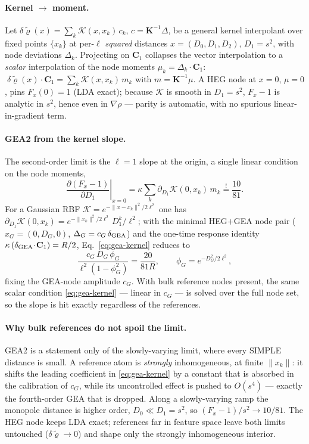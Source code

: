 \paragraph*{Kernel $\to$ moment.} Let $\delta\tilde{\bm\varrho}(x)=\sum_k\mathcal K(x,x_k)\,c_k$,
$c=\mathbf K^{-1}\Delta$, be a general kernel interpolant over fixed points $\{x_k\}$ at per-$\ell$
\emph{squared} distances $x=(D_0,D_1,D_2)$, $D_1=s^2$, with node deviations $\Delta_k$. Projecting on
$\mathbf C_1$ collapses the vector interpolation to a \emph{scalar} interpolation of the node moments
$\mu_k=\Delta_k\!\cdot\!\mathbf C_1$: $\;\delta\tilde{\bm\varrho}(x)\!\cdot\!\mathbf C_1=\sum_k\mathcal K(x,x_k)\,m_k$ with
$m=\mathbf K^{-1}\mu$. A HEG node at $x=0$, $\mu=0$, pins $F_x(0)=1$ (LDA exact); because $\mathcal K$
is smooth in $D_1=s^2$, $F_x-1$ is analytic in $s^2$, hence even in $\nabla\rho$ --- parity is
automatic, with no spurious linear-in-gradient term.

\paragraph*{GEA2 from the kernel slope.} The second-order limit is the $\ell=1$ slope at the
origin, a single linear condition on the node moments,
\begin{equation}
\left.\frac{\partial(F_x-1)}{\partial D_1}\right|_{x=0}
=\kappa\sum_k\partial_{D_1}\mathcal K(0,x_k)\,m_k\stackrel{!}{=}\frac{10}{81}.
\label{eq:gea-kernel}
\end{equation}
For a Gaussian RBF $\mathcal K=e^{-\|x-x_k\|^2/2\ell^2}$ one has
$\partial_{D_1}\mathcal K(0,x_k)=e^{-\|x_k\|^2/2\ell^2}\,D_1^k/\ell^2$; with the minimal HEG$+$GEA
node pair ($x_G=(0,D_G,0)$, $\Delta_G=c_G\,\delta_{\rm GEA}$) and the one-time response identity
$\kappa\,(\delta_{\rm GEA}\!\cdot\!\mathbf C_1)=R/2$, Eq.~\eqref{eq:gea-kernel} reduces to
\begin{equation}
\frac{c_G\,D_G\,\phi_G}{\ell^2(1-\phi_G^2)}=\frac{20}{81R},\qquad \phi_G=e^{-D_G^2/2\ell^2},
\label{eq:cG}
\end{equation}
fixing the GEA-node amplitude $c_G$. With bulk reference nodes present, the same scalar condition
\eqref{eq:gea-kernel} --- linear in $c_G$ --- is solved over the full node set, so the slope is hit
exactly regardless of the references.

\paragraph*{Why bulk references do not spoil the limit.} GEA2 is a statement only of the
slowly-varying limit, where every SIMPLE distance is small. A reference atom is \emph{strongly}
inhomogeneous, at finite $\|x_k\|$: it shifts the leading coefficient in \eqref{eq:gea-kernel} by a
constant that is absorbed in the calibration of $c_G$, while its uncontrolled effect is pushed to
$O(s^4)$ --- exactly the fourth-order GEA that is dropped. Along a slowly-varying ramp the monopole
distance is higher order, $D_0\ll D_1=s^2$, so $(F_x-1)/s^2\to 10/81$. The HEG node keeps LDA exact;
references far in feature space leave both limits untouched ($\delta\tilde{\bm\varrho}\to0$) and shape only the
strongly inhomogeneous interior.

